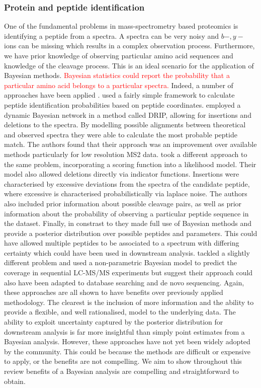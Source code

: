 \documentclass[12pt,english, journal=jpr, layout=twocolumn]{article}
\begin{document}
\subsubsection{Protein and peptide identification}
One of the fundamental problems in mass-spectrometry based proteomics is identifying a peptide from a spectra. A spectra can be very noisy and $b-,y-$ ions can be missing which results in a complex observation process. Furthermore, we have prior knowledge of observing particular amino acid sequences and knowledge of the cleavage process. This is an ideal scenario for the application of Bayesian methods. \textcolor{red}{Bayesian statistics could report the probability that a particular amino acid belongs to a particular spectra.} Indeed, a number of approaches have been applied \citep{Chen::2005, Halloran::2016, Lewis::2018, Claassen::2009}. \citet{Chen::2005} used a fairly simple framework to calculate peptide identification probabilities based on peptide coordinates. \citet{Halloran::2016} employed a dynamic Bayesian network in a method called DRIP, allowing for insertions and deletions to the spectra. By modelling possible alignments between theoretical and observed spectra they were able to calculate the most probable peptide match. The authors found that their approach was an improvement over available methods particularly for low resolution MS2 data. \citet{Lewis::2018} took a different approach to the same problem, incorporating a scoring function into a likelihood model. Their model also allowed deletions directly via indicator functions. Insertions were characterised by excessive deviations from the spectra of the candidate peptide, where excessive is characterised probabilistically via laplace noise. The authors also included prior information about possible cleavage pairs, as well as prior information about the probability of observing a particular peptide sequence in the dataset. Finally, in constrast to \citet{Halloran::2016} they made full use of Bayesian methods and provide a posterior distribution over possible peptides and parameters. This could have allowed multiple peptides to be associated to a spectrum with differing certainty which could have been used in downstream analysis. \citet{Claassen::2009} tackled a slightly different problem and used a non-parametric Bayesian model to predict the coverage in sequential LC-MS/MS experiments but suggest their approach could also have been adapted to database searching and de novo sequencing. Again, these approaches are all shown to have benefits over previously applied methodology. The clearest is the inclusion of more information and the ability to provide a flexible, and well rationalised, model to the underlying data. The ability to exploit uncertainty captured by the posterior distribution for downstream analysis is far more insightful than simply point estimates from a Bayesian analysis. However, these approaches have not yet been widely adopted by the community. This could be because the methods are difficult or expensive to apply, or the benefits are not compelling. We aim to show throughout this review benefits of a Bayesian analysis are compelling and straightforward to obtain.
\end{document}
